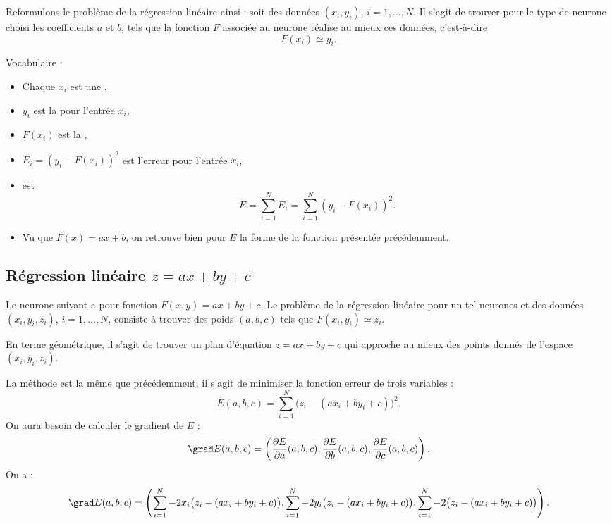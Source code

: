 \documentclass[11pt,class=report,crop=false]{standalone}
\begin{document}
Reformulons le problème de la régression linéaire ainsi : soit des données $(x_i,y_i)$, $i=1,\ldots,N$. Il s'agit de trouver pour le type de neurone choisi les coefficients $a$ et $b$, tels que la fonction $F$ associée au neurone réalise au mieux ces données, c'est-à-dire 
$$F(x_i) \simeq y_i.$$

Vocabulaire :
\begin{itemize}
  \item Chaque $x_i$ est une ,
  \item $y_i$ est la  pour l'entrée $x_i$,
  \item $F(x_i)$ est la ,
  \item $E_i = (y_i - F(x_i))^2$ est l'erreur pour l'entrée $x_i$,
  \item {} est $$E = \sum_{i=1}^N E_i =  \sum_{i=1}^N(y_i - F(x_i))^2.$$
  \item Vu que $F(x)=ax+b$, on retrouve bien pour $E$ la forme de la fonction présentée précédemment.
\end{itemize}


\subsection{Régression linéaire $z=ax+by+c$}

Le neurone suivant a pour fonction $F(x,y) = ax+by+c$.
Le problème de la régression linéaire pour un tel neurones et des données $(x_i,y_i,z_i)$,  $i=1,\ldots,N$, consiste à trouver des poids $(a,b,c)$ tels que $F(x_i,y_i) \simeq z_i$.


En terme géométrique, il s'agit de trouver un plan d'équation $z=ax+by+c$ qui approche au mieux des points donnés de l'espace $(x_i,y_i,z_i)$. 



La méthode est la même que précédemment, il s'agit de minimiser la fonction erreur de trois variables :
$$E(a,b,c) = \sum_{i=1}^N \big(z_i - (ax_i+by_i+c)\big)^2.$$
On aura besoin de calculer le gradient de $E$ :
$$\grad E(a,b,c) 
= \left(\frac{\partial E}{\partial a}(a,b,c), \frac{\partial E}{\partial b}(a,b,c), \frac{\partial E}{\partial c}(a,b,c)\right).$$
On a : 
{\small
$$\grad E(a,b,c) 
= \left(
\sum_{i=1}^{N} -2x_i\big(z_i - (ax_i+by_i+c)\big),  
\sum_{i=1}^{N} -2y_i\big(z_i - (ax_i+by_i+c)\big), 
\sum_{i=1}^{N} -2\big(z_i - (ax_i+by_i+c)\big)
\right).$$
}
\end{document}
